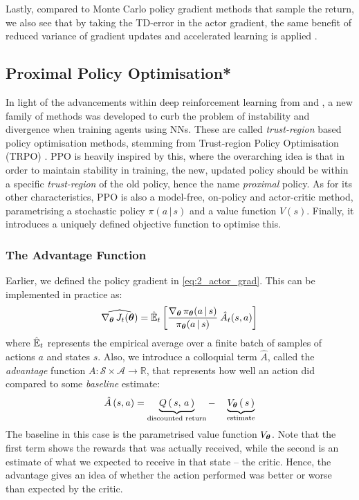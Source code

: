 Lastly, compared to Monte Carlo policy gradient methods that sample the return, we also see that by taking the TD-error in the actor gradient, the same benefit of reduced variance of gradient updates and accelerated learning is applied \cite{suttonAndBartoBook}.


\subsection{Proximal Policy Optimisation*}
\label{subsec:2_PPO}

In light of the advancements within deep reinforcement learning from \cite{DQN} and \cite{DDPG}, a new family of methods was developed to curb the problem of instability and divergence when training agents using NNs. These are called \textit{trust-region} based policy optimisation methods, stemming from Trust-region Policy Optimisation (TRPO) \cite{TRPO}.
PPO \cite{PPO} is heavily inspired by this, where the overarching idea is that in order to maintain stability in training, the new, updated policy should be within a specific \textit{trust-region} of the old policy, hence the name \textit{proximal} policy.
As for its other characteristics, PPO is also a model-free, on-policy and actor-critic method, parametrising a stochastic policy $\pi(a\,|\,s)$ and a value function $V(s)$. Finally, it introduces a uniquely defined objective function to optimise this.

\subsubsection{The Advantage Function}
Earlier, we defined the policy gradient in \eqref{eq:2_actor_grad}. This can be implemented in practice as:
\begin{equation}
    \widehat{\nabla_{\boldsymbol{\theta}} \, J_t(\boldsymbol{\theta})} = \hat{\mathbb{E}}_t \left[ 
    \frac{\nabla_{\boldsymbol{\theta}} \, \pi_{\boldsymbol{\theta}} (a \, | \, s)}{\pi_{\boldsymbol{\theta}} (a \, | \, s)} \: \hat{A}_t (s, a) 
    \right] \label{eq:2_ppo_actor_grad}
\end{equation}
where $\hat{\mathbb{E}}_t$ represents the empirical average over a finite batch of samples of actions $a$ and states $s$. Also, we introduce a colloquial term $\hat{A}$, called the \textit{advantage} function $A : \mathcal{S} \times \mathcal{A} \rightarrow \mathbb{R}$, that represents how well an action did compared to some \textit{baseline} estimate:
\begin{equation}
    \hat{A}\,(s ,a) = \underbrace{Q\, (\,s,\, a\,)}_{\text{discounted return}} - \quad \underbrace{V_{\boldsymbol{\theta}}\,(\,s\,)}_{\text{estimate}} \label{eq:2_ppo_advantage}
\end{equation}
The baseline in this case is the parametrised value function $V_{\boldsymbol{\theta}}$. Note that the first term shows the rewards that was actually received, while the second is an estimate of what we expected to receive in that state -- the critic. Hence, the advantage gives an idea of whether the action performed was better or worse than expected by the critic. 

